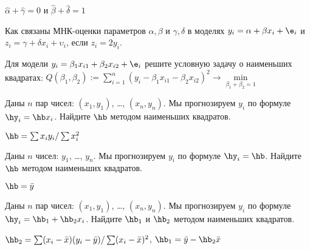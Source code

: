 \documentclass[pdftex,11pt,openany]{book}\usepackage[]{graphicx}\usepackage[]{color}
\begin{document}
\begin{solution}
$\hat{\alpha} + \hat{\gamma} = 0$ и $\hat{\beta} + \hat{\delta} = 1$
\end{solution}



\begin{problem}
 Как связаны МНК-оценки параметров $\alpha, \beta$ и $\gamma, \delta$ в моделях $y_i = \alpha + \beta x_i + \e_i$ и $z_i = \gamma + \delta x_i + \upsilon_i$, если $z_i = 2 y_i$.
\end{problem}

\begin{solution}
\end{solution} 

\begin{problem}
 Для модели $y_i = \beta_1 x_{i1} + \beta_2 x_{i2} + \e_i$ решите условную задачу о наименьших квадратах: $Q(\beta_1, \beta_2) := \sum_{i=1}^n (y_i - \beta_1 x_{i1} - \beta_2 x_{i2})^2 \rightarrow \underset{\beta_1 + \beta_2 = 1}{\min}$
\end{problem}

\begin{solution}
\end{solution} 
 


\begin{problem}
Даны $n$ пар чисел: $(x_1, y_1)$, \ldots, $(x_n,y_n)$. Мы прогнозируем $y_i$ по формуле $\hy_i=\hb x_i$. Найдите $\hb$ методом наименьших квадратов. 
\end{problem} 

\begin{solution}
$\hb=\sum x_i y_i/\sum x_i^2$
\end{solution}

\begin{problem}
Даны $n$ чисел: $y_1$, \ldots, $y_n$. Мы прогнозируем $y_i$ по формуле $\hy_i=\hb$. Найдите $\hb$ методом наименьших квадратов. 
\end{problem}
\begin{solution}
$\hb=\bar{y}$
\end{solution}

\begin{problem}
Даны $n$ пар чисел: $(x_1, y_1)$, \ldots, $(x_n,y_n)$. Мы прогнозируем $y_i$ по формуле $\hy_i=\hb_1+\hb_2 x_i$. Найдите $\hb_1$ и $\hb_2$ методом наименьших квадратов. 
\end{problem}
\begin{solution}
$\hb_2=\sum (x_i-\bar{x})(y_i-\bar{y})/\sum(x_i-\bar{x})^2$, $\hb_1=\bar{y}-\hb_2\bar{x}$
\end{solution}
\end{document}
